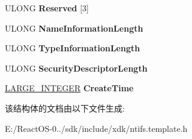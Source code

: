 \begin{DoxyCompactItemize}
U\+L\+O\+NG {\bfseries Reserved} \mbox{[}3\mbox{]}
\item 
\mbox{\label{struct___o_b_j_e_c_t___b_a_s_i_c___i_n_f_o_a6c90e4b4f96955c6c302c316e3c8fc5c}} 
U\+L\+O\+NG {\bfseries Name\+Information\+Length}
\item 
\mbox{\label{struct___o_b_j_e_c_t___b_a_s_i_c___i_n_f_o_a2249924e438b5d4a1acc2bb3d0ba65f7}} 
U\+L\+O\+NG {\bfseries Type\+Information\+Length}
\item 
\mbox{\label{struct___o_b_j_e_c_t___b_a_s_i_c___i_n_f_o_ac39adaafa669c3527fe05773c111147f}} 
U\+L\+O\+NG {\bfseries Security\+Descriptor\+Length}
\item 
\mbox{\label{struct___o_b_j_e_c_t___b_a_s_i_c___i_n_f_o_ac994a71abc78cb4220e86a6f84811f27}} 
\hyperlink{union___l_a_r_g_e___i_n_t_e_g_e_r}{L\+A\+R\+G\+E\+\_\+\+I\+N\+T\+E\+G\+ER} {\bfseries Create\+Time}
\end{DoxyCompactItemize}


该结构体的文档由以下文件生成\+:\begin{DoxyCompactItemize}
\item 
E\+:/\+React\+O\+S-\/0../sdk/include/xdk/ntifs.\+template.\+h\end{DoxyCompactItemize}
